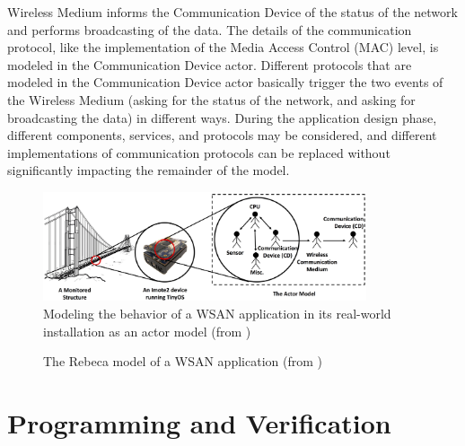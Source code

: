\documentclass[
graybox,
envcountchap
]{svmult}
\begin{document}
\begin{bibunit}
Wireless Medium  informs the Communication Device of the status of the network and performs broadcasting of the data.
%
The details of the communication protocol, like the implementation of the Media Access Control (MAC) level, is modeled in the Communication Device actor.
Different protocols that are modeled in the Communication Device actor basically trigger the two events of the Wireless Medium (asking for the status of the network, and asking for broadcasting the data) in different ways.
%
During the application design phase, different components, services, and protocols may be considered, and different implementations of communication protocols can be replaced without significantly impacting the remainder of the model. 



\begin{figure}
\centering
\includegraphics[width=0.85\textwidth]{assets/TinyOS}
\caption{Modeling the behavior of a WSAN application in its real-world installation as an actor model 
(from \cite{DBLP:journals/sttt/KhamespanahSMA18})}
\label{fig::WSAN-actor-model}
\end{figure}

\begin{center}
\begin{figure}

\caption{The Rebeca model of a WSAN application (from \cite{DBLP:conf/birthday/Sirjani18})}
\label{fig::wsan-model}
\end{figure}
\end{center}

    
\section{Programming and Verification}\label{sec:Programming}


\end{bibunit}
\end{document}
